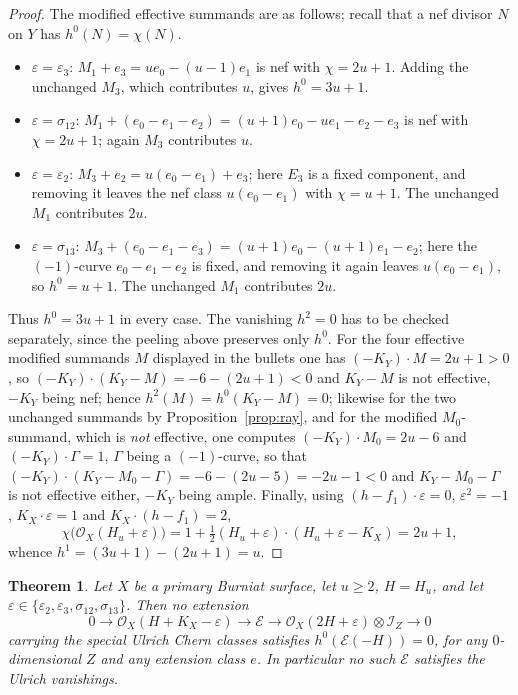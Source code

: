 \documentclass[10pt,a4paper]{amsart}
\newtheorem{theorem}{Theorem}[section]
\newcommand{\OO}{\mathcal{O}}
\newcommand{\EE}{\mathcal{E}}
\newcommand{\II}{\mathcal{I}}
\begin{document}
\begin{proof}
The modified effective summands are as follows; recall that a nef divisor $N$ on $Y$ has $h^0(N)=\chi(N)$.
\begin{itemize}[leftmargin=1.4em]
\item $\varepsilon=\varepsilon_3$: $M_1+e_3=ue_0-(u-1)e_1$ is nef with $\chi=2u+1$. Adding the unchanged $M_3$, which contributes $u$, gives $h^0=3u+1$.
\item $\varepsilon=\sigma_{12}$: $M_1+(e_0-e_1-e_2)=(u+1)e_0-ue_1-e_2-e_3$ is nef with $\chi=2u+1$; again $M_3$ contributes $u$.
\item $\varepsilon=\varepsilon_2$: $M_3+e_2=u(e_0-e_1)+e_3$; here $E_3$ is a fixed component, and removing it leaves the nef class $u(e_0-e_1)$ with $\chi=u+1$. The unchanged $M_1$ contributes $2u$.
\item $\varepsilon=\sigma_{13}$: $M_3+(e_0-e_1-e_3)=(u+1)e_0-(u+1)e_1-e_2$; here the $(-1)$-curve $e_0-e_1-e_2$ is fixed, and removing it again leaves $u(e_0-e_1)$, so $h^0=u+1$. The unchanged $M_1$ contributes $2u$.
\end{itemize}
Thus $h^0=3u+1$ in every case. The vanishing $h^2=0$ has to be checked separately, since the peeling above preserves only $h^0$. For the four effective modified summands $M$ displayed in the bullets one has $(-K_Y)\cdot M=2u+1>0$, so $(-K_Y)\cdot(K_Y-M)=-6-(2u+1)<0$ and $K_Y-M$ is not effective, $-K_Y$ being nef; hence $h^2(M)=h^0(K_Y-M)=0$; likewise for the two unchanged summands by Proposition~\ref{prop:ray}, and for the modified $M_0$-summand, which is \emph{not} effective, one computes $(-K_Y)\cdot M_0=2u-6$ and $(-K_Y)\cdot\Gamma=1$, $\Gamma$ being a $(-1)$-curve, so that $(-K_Y)\cdot(K_Y-M_0-\Gamma)=-6-(2u-5)=-2u-1<0$ and $K_Y-M_0-\Gamma$ is not effective either, $-K_Y$ being ample. Finally, using $(h-f_1)\cdot\varepsilon=0$, $\varepsilon^2=-1$, $K_X\cdot\varepsilon=1$ and $K_X\cdot(h-f_1)=2$,
\[
\chi\bigl(\OO_X(H_u+\varepsilon)\bigr)=1+\tfrac12(H_u+\varepsilon)\cdot(H_u+\varepsilon-K_X)=2u+1 ,
\]
whence $h^1=(3u+1)-(2u+1)=u$.
\end{proof}

\begin{theorem}\label{thm:twistedfail}
Let $X$ be a primary Burniat surface, let $u\ge2$, $H=H_u$, and let $\varepsilon\in\{\varepsilon_2,\varepsilon_3,\sigma_{12},\sigma_{13}\}$. Then no extension
\[
0\longrightarrow\OO_X(H+K_X-\varepsilon)\longrightarrow\EE\longrightarrow\OO_X(2H+\varepsilon)\otimes\II_Z\longrightarrow0
\]
carrying the special Ulrich Chern classes satisfies $h^0(\EE(-H))=0$, for any $0$-dimensional $Z$ and any extension class $e$. In particular no such $\EE$ satisfies the Ulrich vanishings.
\end{theorem}
\end{document}
